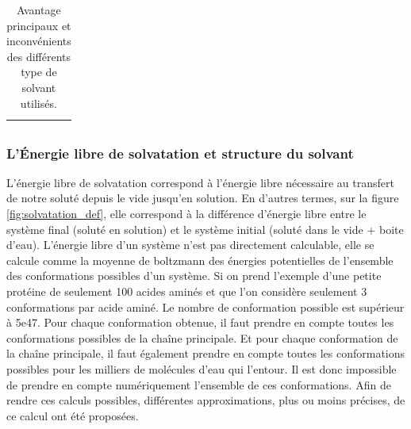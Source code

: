 \begin{table}[H]
\begin{tabular}{ l | c c | c c }
  \hline \multicolumn{5}{c}{} \\[-1em]\hline
  \end{tabular}
  \caption{Avantage principaux et inconvénients des différents type de solvant utilisés.}
  \label{tab:temps_calculs}  
\end{table}







\subsubsection{L'\'Energie libre de solvatation et structure du solvant}
L'énergie libre de solvatation correspond à l'énergie libre nécessaire au transfert de notre soluté depuis le vide jusqu'en solution. En d'autres termes, sur la figure \ref{fig:solvatation_def}, elle correspond à la différence d'énergie libre entre le système final (soluté en solution) et le système initial (soluté dans le vide + boite d'eau). L'énergie libre d'un système n'est pas directement calculable, elle se calcule comme la moyenne de boltzmann des énergies potentielles de l'ensemble des conformations possibles d'un système. Si on prend l'exemple d'une petite protéine de seulement 100 acides aminés et que l'on considère seulement 3 conformations par acide aminé. Le nombre de conformation possible est supérieur à 5e47. Pour chaque conformation obtenue, il faut prendre en compte toutes les conformations possibles de la chaîne principale. Et pour chaque conformation de la chaîne principale, il faut également prendre en compte toutes les conformations possibles pour les milliers de molécules d'eau qui l'entour. Il est donc impossible de prendre en compte numériquement l'ensemble de ces conformations. Afin de rendre ces calculs possibles, différentes approximations, plus ou moins précises, de ce calcul ont été proposées.


